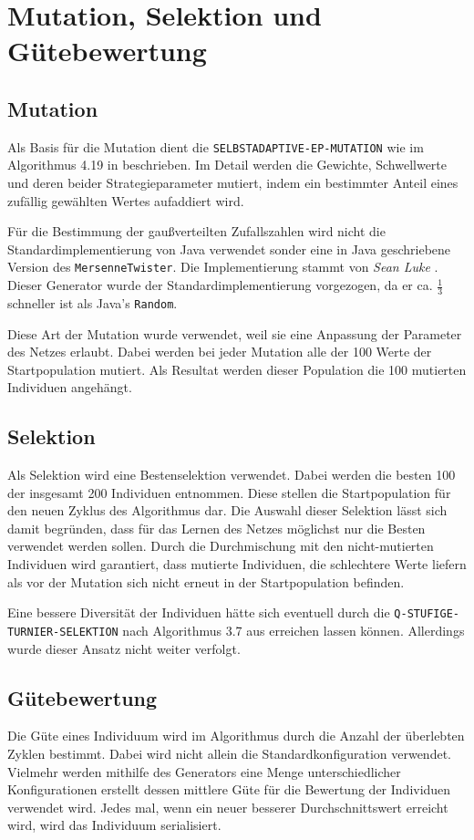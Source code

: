\chapter{Mutation, Selektion und Gütebewertung}

\section{Mutation}
Als Basis für die Mutation dient die \verb+SELBSTADAPTIVE-EP-MUTATION+ wie im Algorithmus 4.19 in \cite{Weicker200709} beschrieben. Im Detail werden die Gewichte, Schwellwerte und deren beider Strategieparameter mutiert, indem ein bestimmter Anteil eines zufällig gewählten Wertes aufaddiert wird. 

Für die Bestimmung der gaußverteilten Zufallszahlen wird nicht die Standardimplementierung von Java verwendet sonder eine in Java geschriebene Version des \verb+MersenneTwister+. Die Implementierung stammt von \textit{Sean Luke} \cite{mersenne}. Dieser Generator wurde der Standardimplementierung vorgezogen, da er ca. $ \frac{1}{3} $ schneller ist als Java's \verb+Random+.

Diese Art der Mutation wurde verwendet, weil sie eine Anpassung der Parameter des Netzes erlaubt. Dabei werden bei jeder Mutation alle der 100 Werte der Startpopulation mutiert. Als Resultat werden dieser Population die 100 mutierten Individuen angehängt.

\section{Selektion}
Als Selektion wird eine Bestenselektion verwendet. Dabei werden die besten 100 der insgesamt 200 Individuen entnommen. Diese stellen die Startpopulation für den neuen Zyklus des Algorithmus dar. Die Auswahl dieser Selektion lässt sich damit begründen, dass für das Lernen des Netzes möglichst nur die Besten verwendet werden sollen. Durch die Durchmischung mit den nicht-mutierten Individuen wird garantiert, dass mutierte Individuen, die schlechtere Werte liefern als vor der Mutation sich nicht erneut in der Startpopulation befinden.

Eine bessere Diversität der Individuen hätte sich eventuell durch die \verb+Q-STUFIGE-TURNIER-SELEKTION+ nach Algorithmus 3.7 aus \cite{Weicker200709} erreichen lassen können. Allerdings wurde dieser Ansatz nicht weiter verfolgt.

\section{Gütebewertung}
Die Güte eines Individuum wird im Algorithmus durch die Anzahl der überlebten Zyklen bestimmt. Dabei wird nicht allein die Standardkonfiguration verwendet. Vielmehr werden mithilfe des Generators eine Menge unterschiedlicher Konfigurationen erstellt dessen mittlere Güte für die Bewertung der Individuen verwendet wird. Jedes mal, wenn ein neuer besserer Durchschnittswert erreicht wird, wird das Individuum serialisiert.